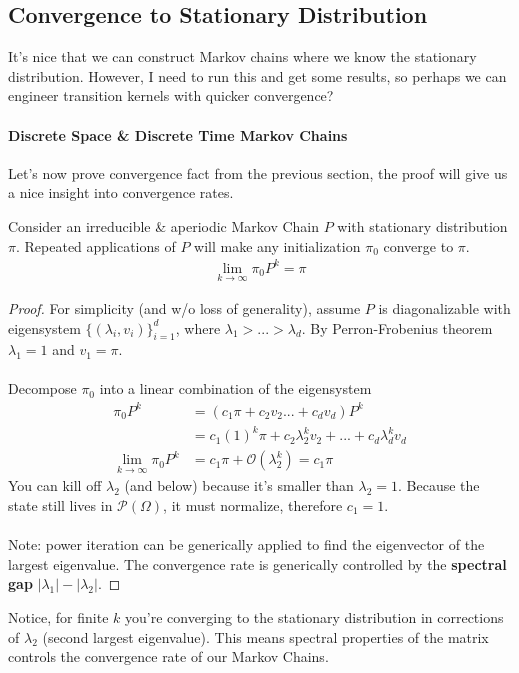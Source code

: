 \subsection{Convergence to Stationary Distribution}
It's nice that we can construct Markov chains where we know the stationary distribution. However, I need to run this and get some results, so perhaps we can engineer transition kernels with quicker convergence?

\paragraph{Discrete Space \& Discrete Time Markov Chains}
Let's now prove convergence fact from the previous section, the proof will give us a nice insight into convergence rates.
\begin{fact}
	Consider an irreducible \& aperiodic Markov Chain $P$ with stationary distribution $\pi$. Repeated applications of $P$ will make any initialization $\pi_0$ converge to $\pi$.
	\begin{align}
		\lim_{k \to \infty} \pi_0 P^k = \pi
	\end{align}
\end{fact}
\begin{proof}
	For simplicity (and w/o loss of generality), assume $P$ is diagonalizable with eigensystem $\{(\lambda_i, v_i)\}_{i=1}^d$, where $\lambda_1 > ... > \lambda_d$. By Perron-Frobenius theorem $\lambda_1 = 1$ and $v_1 = \pi$.\\
	\\
	Decompose $\pi_0$ into a linear combination of the eigensystem
	\begin{align}
		\pi_0 P^k & = (c_1 \pi + c_{2} v_{2} ... + c_d v_d) P^k\\
		& = c_1 (1)^k \pi+ c_{2} \lambda_{2}^k v_{2} + ... + c_d \lambda_d^k v_d\\
		\lim_{k \to \infty}\pi_0 P^k & =  c_1 \pi + \mathcal O(\lambda_{2}^k) = c_1 \pi
	\end{align}
	You can kill off $\lambda_{2}$ (and below) because it's smaller than $\lambda_2 = 1$.
	Because the state still lives in $\mathcal P(\Omega)$, it must normalize, therefore $c_1 = 1$.\\
	\\
	Note: power iteration can be generically applied to find the eigenvector of the largest eigenvalue. The convergence rate is generically controlled by the \textbf{spectral gap} $|\lambda_1| - |\lambda_2|$.
\end{proof}
Notice, for finite $k$ you're converging to the stationary distribution in corrections of $\lambda_{2}$ (second largest eigenvalue). This means spectral properties of the matrix controls the convergence rate of our Markov Chains.

